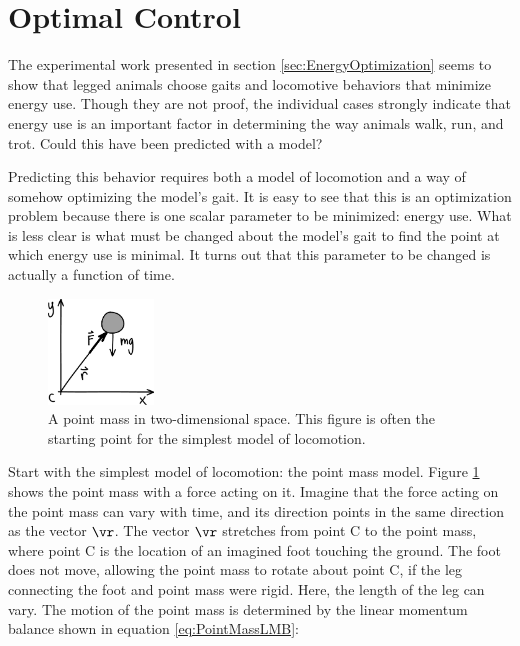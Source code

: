 \section{Optimal Control} %
\label{sec:OptimalControl}

The experimental work presented in section \ref{sec:EnergyOptimization} seems to show that legged animals choose gaits and locomotive behaviors that minimize energy use. Though they are not proof, the individual cases strongly indicate that energy use is an important factor in determining the way animals walk, run, and trot. Could this have been predicted with a model?

Predicting this behavior requires both a model of locomotion and a way of somehow optimizing the model's gait. It is easy to see that this is an optimization problem because there is one scalar parameter to be minimized: energy use. What is less clear is what must be changed about the model's gait to find the point at which energy use is minimal. It turns out that this parameter to be changed is actually a function of time. 

\begin{figure}[h]		%
\begin{centering}
\includegraphics[width=0.25\textwidth]{Figures/PointMass}\par
\end{centering}
\caption[Diagram: A Point Mass in 2D Space]{A point mass in two-dimensional space. This figure is often the starting point for the simplest model of locomotion.}
\label{fig:PointMass}
\end{figure}
%

Start with the simplest model of locomotion: the point mass model. Figure \ref{fig:PointMass} shows the point mass with a force acting on it. Imagine that the force acting on the point mass can vary with time, and its direction points in the same direction as the vector $\vr$. The vector $\vr$ stretches from point C to the point mass, where point C is the location of an imagined foot touching the ground. The foot does not move, allowing the point mass to rotate about point C, if the leg connecting the foot and point mass were rigid. Here, the length of the leg can vary. The motion of the point mass is determined by the linear momentum balance shown in equation \ref{eq:PointMassLMB}:

